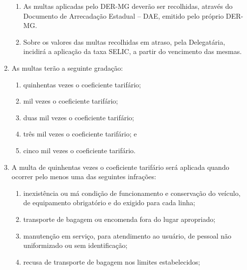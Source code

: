 \begin{enumerate}[resume, label=Art. \arabic*]
\begin{enumerate}[label= \S \arabic*] %

\item As multas aplicadas pelo DER-MG deverão ser recolhidas, através do Documento de Arrecadação Estadual – DAE, emitido pelo próprio DER-MG.

\item Sobre os valores das multas recolhidas em atraso, pela Delegatária, incidirá a aplicação da taxa SELIC, a partir do vencimento das mesmas.

\end{enumerate}

\item As multas terão a seguinte gradação:

\begin{enumerate}[label=\roman*.]

\item quinhentas vezes o coeficiente tarifário;

\item mil vezes o coeficiente tarifário;

\item duas mil vezes o coeficiente tarifário;

\item três mil vezes o coeficiente tarifário; e

\item cinco mil vezes o coeficiente tarifário.

\end{enumerate}

\item A multa de quinhentas vezes o coeficiente tarifário será aplicada quando ocorrer pelo menos uma das seguintes infrações:

\begin{enumerate}[label=\roman*.]

\item inexistência ou má condição de funcionamento e conservação do veículo, de equipamento obrigatório e do exigido para cada linha;

\item transporte de bagagem ou encomenda fora do lugar apropriado;

\item manutenção em serviço, para atendimento ao usuário, de pessoal não uniformizado ou sem identificação;

\item recusa de transporte de bagagem nos limites estabelecidos;


\end{enumerate}
\end{enumerate}
